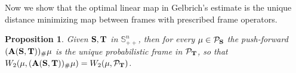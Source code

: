 \documentclass{amsart}
\numberwithin{equation}{section}
\newcommand\cP{{\mathcal P}}
\newcommand\bA{{\bf A}}
\newcommand\bS{{\bf S}}
\newcommand\bT{{\bf T}}
\newcommand\R{{\mathbb R}}
\newcommand\id{{\operatorname{\bf Id}}}
\newcommand\tr{{\operatorname{tr}}}
\theoremstyle{plain}
\newtheorem{proposition}[subsection]{Proposition}
\theoremstyle{definition}
\begin{document}



Now we show that the optimal linear map in Gelbrich's estimate is the unique distance minimizing map between frames with prescribed frame operators.  
\begin{proposition}\label{prop_universal_lin_push}
Given ${\bf S} , {\bf T}$ in $\mathbb{S}^n_{++}$, then for every $\mu \in  \mathcal{P}_{\bf S}$ the push-forward $({\bf A}({\bf S}, {\bf T}))_{\#}\mu$ is the unique probabilistic frame in $\cP_{\bf T}$, so that
$W_2(\mu,  ({\bf A}({\bf S}, {\bf T}))_{\#}\mu )=W_2(\mu, \mathcal{P}_{\bf T})$.  
\end{proposition}
\end{document}
